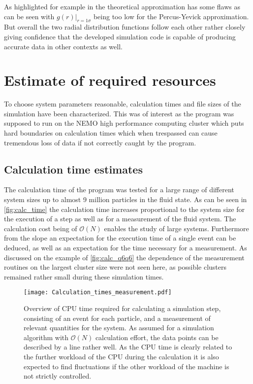 As highlighted for example in \cite{Hansen2006} the theoretical approximation has some flaws as can be seen with $g(r)|_{r=1\sigma}$ being too low for the Percus-Yevick approximation. But overall the two radial distribution functions follow each other rather closely giving confidence that the developed simulation code is capable of producing accurate data in other contexts as well.\\

\section{Estimate of required resources}
\label{sec:resources}
To choose system parameters reasonable, calculation times and file sizes of the simulation have been characterized. This was of interest as the program was supposed to run on the NEMO high performance computing cluster which puts hard boundaries on calculation times which when trespassed can cause tremendous loss of data if not correctly caught by the program.\\
 
\subsection{Calculation time estimates}
\label{sec:calc_times}
The calculation time of the program was tested for a large range of different system sizes up to almost 9 million particles in the fluid state. As can be seen in \autoref{fig:calc_time} the calculation time increases proportional to the system size for the execution of a step as well as for a measurement of the fluid system. The calculation cost being of $\mathcal{O}(N)$ enables the study of large systems. Furthermore from the slope an expectation for the execution time of a single event can be deduced, as well as an expectation for the time necessary for a measurement. As discussed on the example of \autoref{fig:calc_q6q6} the dependence of the measurement routines on the largest cluster size were not seen here, as possible clusters remained rather small during these simulation times.\\

\begin{figure}[h!]
\centering
\texttt{[image: Calculation\_times\_measurement.pdf]}
\caption[Calculation time estimate]{Overview of CPU time required for calculating a simulation step, consisting of an event for each particle, and a measurement of relevant quantities for the system. As assumed for a simulation algorithm with $\mathcal{O}(N)$ calculation effort, the data points can be described by a line rather well. As the CPU time is clearly related to the further workload of the CPU during the calculation it is also expected to find fluctuations if the other workload of the machine is not strictly controlled.}
\label{fig:calc_time}
\end{figure}

